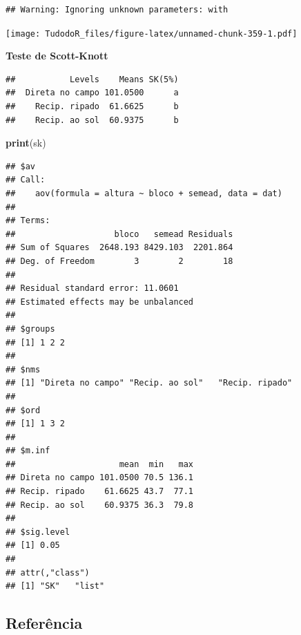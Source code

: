 \documentclass[
]{book}
\newenvironment{Shaded}{\begin{snugshade}}{\end{snugshade}}
\newcommand{\DataTypeTok}[1]{\textcolor[rgb]{0.13,0.29,0.53}{#1}}
\newcommand{\KeywordTok}[1]{\textcolor[rgb]{0.13,0.29,0.53}{\textbf{#1}}}
\newcommand{\NormalTok}[1]{#1}
\newcommand{\OperatorTok}[1]{\textcolor[rgb]{0.81,0.36,0.00}{\textbf{#1}}}
\newcommand{\StringTok}[1]{\textcolor[rgb]{0.31,0.60,0.02}{#1}}
\begin{document}
\begin{verbatim}
## Warning: Ignoring unknown parameters: with
\end{verbatim}

\texttt{[image: TudodoR\_files/figure-latex/unnamed-chunk-359-1.pdf]}

\textbf{Teste de Scott-Knott}

\begin{Shaded}
\end{Shaded}

\begin{verbatim}
##           Levels    Means SK(5%)
##  Direta no campo 101.0500      a
##    Recip. ripado  61.6625      b
##    Recip. ao sol  60.9375      b
\end{verbatim}

\begin{Shaded}
\begin{Highlighting}[]
\KeywordTok{print}\NormalTok{(sk)}
\end{Highlighting}
\end{Shaded}

\begin{verbatim}
## $av
## Call:
##    aov(formula = altura ~ bloco + semead, data = dat)
## 
## Terms:
##                    bloco   semead Residuals
## Sum of Squares  2648.193 8429.103  2201.864
## Deg. of Freedom        3        2        18
## 
## Residual standard error: 11.0601
## Estimated effects may be unbalanced
## 
## $groups
## [1] 1 2 2
## 
## $nms
## [1] "Direta no campo" "Recip. ao sol"   "Recip. ripado"  
## 
## $ord
## [1] 1 3 2
## 
## $m.inf
##                     mean  min   max
## Direta no campo 101.0500 70.5 136.1
## Recip. ripado    61.6625 43.7  77.1
## Recip. ao sol    60.9375 36.3  79.8
## 
## $sig.level
## [1] 0.05
## 
## attr(,"class")
## [1] "SK"   "list"
\end{verbatim}

\hypertarget{referuxeancia-5}{%
\subsection{Referência}\label{referuxeancia-5}}
\end{document}

